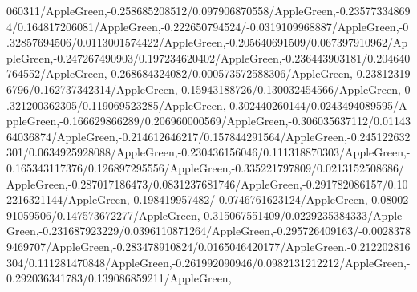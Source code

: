 {\begin{tikzternal}
{060311/AppleGreen,-0.258685208512/0.097906870558/AppleGreen,-0.235773348694/0.164817206081/AppleGreen,-0.222650794524/-0.0319109968887/AppleGreen,-0.32857694506/0.0113001574422/AppleGreen,-0.205640691509/0.067397910962/AppleGreen,-0.247267490903/0.197234620402/AppleGreen,-0.236443903181/0.204640764552/AppleGreen,-0.268684324082/0.000573572588306/AppleGreen,-0.238123196796/0.162737342314/AppleGreen,-0.15943188726/0.130032454566/AppleGreen,-0.321200362305/0.119069523285/AppleGreen,-0.302440260144/0.0243494089595/AppleGreen,-0.166629866289/0.206960000569/AppleGreen,-0.306035637112/0.0114364036874/AppleGreen,-0.214612646217/0.157844291564/AppleGreen,-0.245122632301/0.0634925928088/AppleGreen,-0.230436156046/0.111318870303/AppleGreen,-0.165343117376/0.126897295556/AppleGreen,-0.335221797809/0.0213152508686/AppleGreen,-0.287017186473/0.0831237681746/AppleGreen,-0.291782086157/0.102216321144/AppleGreen,-0.198419957482/-0.0746761623124/AppleGreen,-0.0800291059506/0.147573672277/AppleGreen,-0.315067551409/0.0229235384333/AppleGreen,-0.231687923229/0.0396110871264/AppleGreen,-0.295726409163/-0.00283789469707/AppleGreen,-0.283478910824/0.0165046420177/AppleGreen,-0.212202816304/0.111281470848/AppleGreen,-0.261992090946/0.0982131212212/AppleGreen,-0.292036341783/0.139086859211/AppleGreen,
}
\end{tikzternal}}
